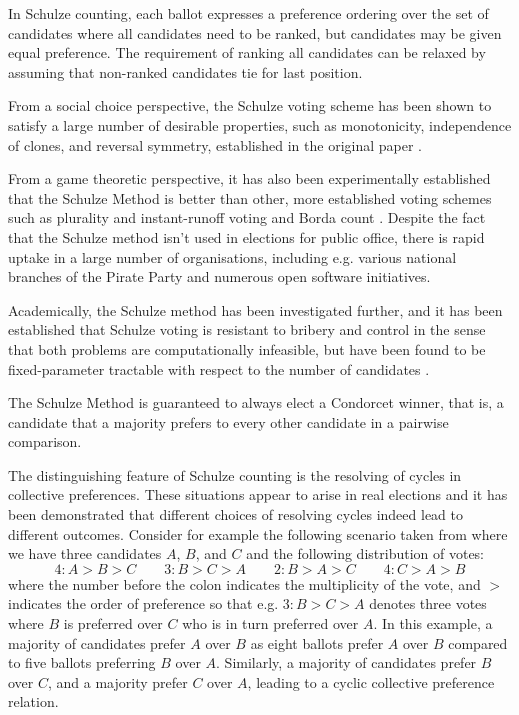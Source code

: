 \documentclass{llncs}
\begin{document}
In Schulze counting, each ballot expresses a
preference ordering over the set of candidates where all candidates
need to be ranked, but candidates may
be given equal preference. The requirement of ranking all candidates
can be relaxed by assuming that non-ranked candidates tie for last
position.

From a social choice perspective, the Schulze voting scheme has been
shown to satisfy a large number of desirable properties, such as
monotonicity, independence of clones, and reversal symmetry, 
established in the original paper \cite{Schulze:2011:NMC}.

From a game theoretic perspective, it has also been experimentally
established that the Schulze Method is better than other, more
established voting schemes such as plurality and instant-runoff
voting and Borda count \cite{Rivest:2010:OSW}.  Despite the fact
that the Schulze method isn't used in elections for public office,
there is rapid uptake in a large number of organisations, including
e.g. various national branches of the Pirate Party and numerous open
software initiatives. 

Academically, the Schulze method has been investigated further, and
it has been established that Schulze voting is resistant to bribery
and control  \cite{Parkes:2012:CSB} in the sense that both problems
are computationally infeasible, but have been found to be
fixed-parameter tractable with respect to the number of candidates
\cite{Hemaspaandra:2016:SRP}.


The Schulze Method is guaranteed to always elect a Condorcet winner,
that is, a candidate that a majority prefers to every other
candidate in a pairwise comparison. 

The distinguishing feature of Schulze counting is the resolving of cycles in
collective preferences. These situations appear
to arise in real elections \cite{Kurrild-Klitgaard:2001:EEC} and it
has been demonstrated that different choices of resolving 
cycles indeed lead to different outcomes.
Consider for example the
following scenario taken from \cite{Brandt:2016:ICS} where we have three candidates $A$, $B$, and $C$
and the following distribution of votes:
\[ 4: A > B > C \qquad 3: B>C>A \qquad 2: B>A>C \qquad 4:C>A>B \]
where the number before the colon indicates the multiplicity of the
vote, and $>$ indicates the order of preference so that e.g.
$3:B>C>A$ denotes three votes where $B$ is preferred over $C$ who
is in turn preferred over $A$.
In this example, a majority of candidates prefer $A$ over $B$ as
eight ballots prefer $A$ over $B$ compared to five ballots
preferring $B$ over $A$. Similarly, a majority of candidates prefer
$B$ over $C$, and a majority prefer $C$ over $A$, leading to a
cyclic collective preference relation.
\end{document}
